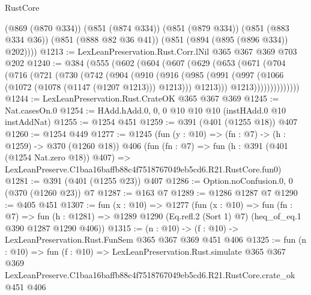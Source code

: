 \begin{lexlean}{RustCore}
\begin{coremodule}
        (@869 (@870 @334))
        (@851 (@874 @334))
        (@851 (@879 @334))
        (@851 (@883 @334 @36))
        (@851 (@888 @82 @36 @41))
        (@851 (@894 (@895 (@896 @334)) @202))))
@1213 := LexLeanPreservation.Rust.Corr.lNil @365 @367 @369 @703 @202
@1240 := @384
    (@555
      (@602
        (@604
          (@607
            (@629
              (@653
                (@671
                  (@704
                    (@716
                      (@721
                        (@730
                          (@742
                            (@904
                              (@910
                                (@916
                                  (@985
                                    (@991
                                      (@997 (@1066 (@1072 (@1078 (@1147 (@1207 @1213))) @1213)))
                                      @1213)))
                                @1213))))))))))))))
@1244 := LexLeanPreservation.Rust.CrateOK @365 @367 @369
@1245 := Nat.casesOn.{0}
@1254 := HAdd.hAdd.{0, 0, 0} @10 @10 @10 (instHAdd.{0} @10 instAddNat)
@1255 := @1254 @451
@1259 := @391 (@401 (@1255 @18)) @407
@1260 := @1254 @449
@1277 := @1245
    (fun (y : @10) => (fn : @7) -> (h : @1259) -> @370 (@1260 @18))
    @406
    (fun (fn : @7) =>
    fun (h : @391 (@401 (@1254 Nat.zero @18)) @407) =>
    LexLeanPreserve.C1baa16baffb88c4f7518767049eb5cd6.R21.RustCore.fun0)
@1281 := @391 (@401 (@1255 @23)) @407
@1286 := Option.noConfusion.{0, 0} (@370 (@1260 @23)) @7
@1287 := @163 @7
@1289 := @1286 @1287 @7
@1290 := @405 @451
@1307 := fun (x : @10) =>
  @1277
    (fun (x : @10) =>
    fun (fn : @7) =>
    fun (h : @1281) => @1289 @1290 (Eq.refl.{2} (Sort 1) @7) (heq_of_eq.{1} @390 @1287 @1290 @406))
@1315 := (n : @10) -> (f : @10) -> LexLeanPreservation.Rust.FunSem @365 @367 @369 @451 @406
@1325 := fun (n : @10) =>
  fun (f : @10) =>
  LexLeanPreservation.Rust.simulate
    @365
    @367
    @369
    LexLeanPreserve.C1baa16baffb88c4f7518767049eb5cd6.R21.RustCore.crate_ok
    @451
    @406
\end{coremodule}
\end{lexlean}
